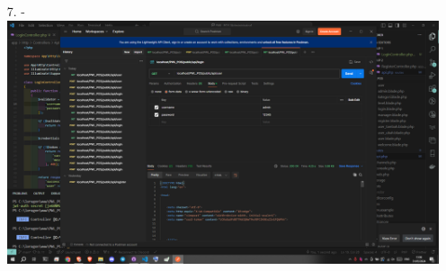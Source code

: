 \documentclass[12pt,titlepage]{article}
\begin{document}
\begin{enumerate}
    \item[7.] - \\ \includegraphics[width=.9\textwidth]{images/figures/Screenshot (478).png}
\end{enumerate}
\end{document}
